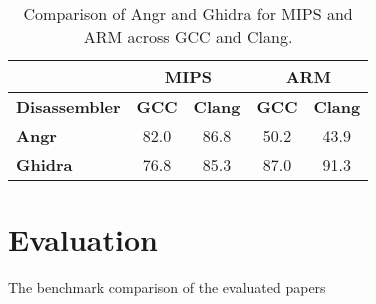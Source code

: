 \documentclass[seminar]{plai}
\begin{document}
\begin{table}[H]
\centering
\begin{tabular}{|l|c|c||c|c|}
\hline
 & \multicolumn{2}{c||}{\textbf{MIPS}} & \multicolumn{2}{c|}{\textbf{ARM}} \\
\hline
\textbf{Disassembler} & \textbf{GCC} & \textbf{Clang} & \textbf{GCC} & \textbf{Clang} \\
\hline
\textbf{Angr}   & 82.0 & 86.8 & 50.2 & 43.9 \\
\hline
\textbf{Ghidra} & 76.8 & 85.3 & 87.0 & 91.3 \\
\hline
\end{tabular}
\caption{Comparison of Angr and Ghidra for MIPS and ARM across GCC and Clang.}
\end{table}

\begin{table}[H]
\centering
{}
\caption{Comparison of Angr and Ghidra on Instruction Boundary and Function Boundary metrics.\cite{an-empirical-study-on-ARM-disassembly-disassembly-tools}}
\end{table}




\section{Evaluation}
\label{sec:evaluation}

The benchmark comparison of the evaluated papers 


\end{document}
